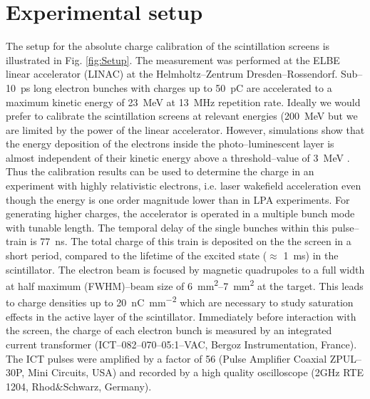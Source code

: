 \documentclass[%
preprint,
amsmath,
amssymb,
aip,
rsi, 
numerical,
floatfix,
]{revtex4-1}
\newcommand{\myCite}[1]{\textcolor{blue}{\cite{#1}}}
\begin{document}
\section{\label{Set} Experimental setup}

The setup for the absolute charge calibration of the scintillation screens is illustrated in Fig. \ref{fig:Setup}.
The measurement was performed at the ELBE linear accelerator (LINAC) at the Helmholtz--Zentrum Dresden--Rossendorf. 
Sub--\SI{10}{\pico\second} long electron bunches with charges up to \SI{50}{\pico\coulomb} are accelerated to a maximum kinetic energy of \SI{23}{\mega\electronvolt} at \SI{13}{\mega\hertz} repetition rate. 
Ideally we would prefer to calibrate the scintillation screens at relevant energies (\SI{200}{\mega\electronvolt} but we are limited by the power of the linear accelerator.
However, simulations show that the energy deposition of the electrons inside the photo--luminescent layer is almost independent of their kinetic energy above a threshold--value of \SI{3}{\mega\electronvolt} \myCite{Hidding2007,Glinec2006,Masuda2008}.
Thus the calibration results can be used to determine the charge in an experiment with highly relativistic electrons, i.e. laser wakefield acceleration even though the energy is one order magnitude lower than in LPA experiments. 
For generating higher charges, the accelerator is operated in a multiple bunch mode with tunable length. 
The temporal delay of the single bunches within this pulse--train is \SI{77}{\nano\second}. 
The total charge of this train is deposited on the the screen in a short period, compared to the lifetime of the excited state ($\approx$ \SI{1}{\milli\second}) in the scintillator\myCite{Morlotti1997}.
The electron beam is focused by magnetic quadrupoles to a full width at half maximum (FWHM)--beam size of \SIrange{6}{7}{\milli\metre^2} at the target.
This leads to charge densities up to \SI[per-mode=symbol]{20}{\nano\coulomb \per \square\milli\meter} which are necessary to study saturation effects in the active layer of the scintillator.
Immediately before interaction with the screen, the charge of each electron bunch is measured by an integrated current transformer (ICT--082--070--05:1--VAC, Bergoz Instrumentation, France). 
The ICT pulses were amplified by a factor of 56 (Pulse Amplifier Coaxial ZPUL--30P, Mini Circuits, USA) and recorded by a high quality oscilloscope (2GHz RTE 1204, Rhod$\&$Schwarz, Germany).
\end{document}
